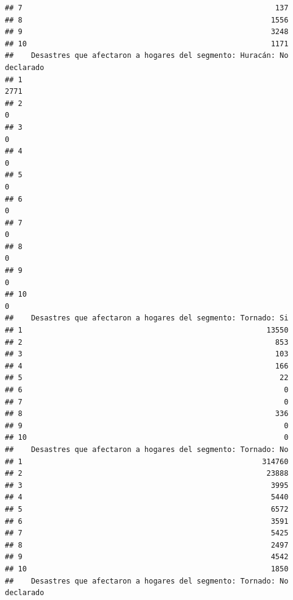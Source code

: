 \documentclass[11pt,]{article}
\begin{document}
\begin{verbatim}
## 7                                                          137
## 8                                                         1556
## 9                                                         3248
## 10                                                        1171
##    Desastres que afectaron a hogares del segmento: Huracán: No declarado
## 1                                                                   2771
## 2                                                                      0
## 3                                                                      0
## 4                                                                      0
## 5                                                                      0
## 6                                                                      0
## 7                                                                      0
## 8                                                                      0
## 9                                                                      0
## 10                                                                     0
##    Desastres que afectaron a hogares del segmento: Tornado: Si
## 1                                                        13550
## 2                                                          853
## 3                                                          103
## 4                                                          166
## 5                                                           22
## 6                                                            0
## 7                                                            0
## 8                                                          336
## 9                                                            0
## 10                                                           0
##    Desastres que afectaron a hogares del segmento: Tornado: No
## 1                                                       314760
## 2                                                        23888
## 3                                                         3995
## 4                                                         5440
## 5                                                         6572
## 6                                                         3591
## 7                                                         5425
## 8                                                         2497
## 9                                                         4542
## 10                                                        1850
##    Desastres que afectaron a hogares del segmento: Tornado: No declarado

\end{verbatim}
\end{document}
